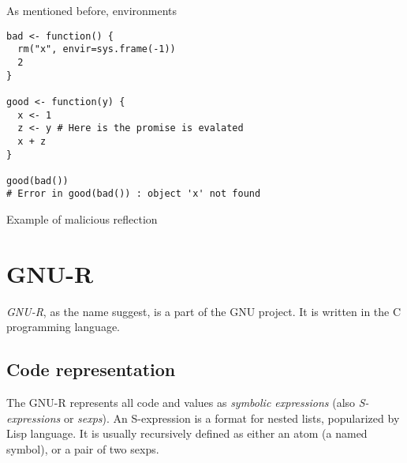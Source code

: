 \todoadd
As mentioned before, environments

\begin{listing}
  \centering
  \begin{verbatim}
bad <- function() {
  rm("x", envir=sys.frame(-1))
  2
}

good <- function(y) {
  x <- 1
  z <- y # Here is the promise is evalated
  x + z
}

good(bad())
# Error in good(bad()) : object 'x' not found
  \end{verbatim}
  \caption{Example of malicious reflection}\label{lst:bad-ref}
\end{listing}


%


\section{GNU-R}

\textit{GNU-R}, as the name suggest, is a part of the GNU project. It is written in the C programming language. 

\subsection{Code representation}

The GNU-R represents all code and values as \textit{symbolic expressions} (also \textit{S-expressions} or \textit{sexps}). An S-expression is a format for nested lists, popularized by Lisp language. It is usually recursively defined as either an atom (a named symbol), or a pair of two sexps.

